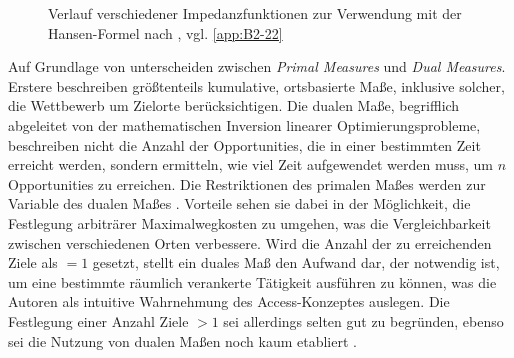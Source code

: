 \documentclass[11pt,pdftex,a4paper]{scrartcl}
\begin{document}
	\begin{figure}[!htb]
		\centering
		\caption[Impedanzfunktionen nach \textcite{levinsonTransportAccessManual2020}]{Verlauf verschiedener Impedanzfunktionen zur Verwendung mit der Hansen-Formel nach \textcite[49]{levinsonTransportAccessManual2020}, vgl. \ref{app:B2-22}}
		
		\label{fig:impedancefunctions}
	\end{figure}
	
	Auf Grundlage von \textcite{cuiPrimalDualAccess2020} unterscheiden \textcite[53]{levinsonTransportAccessManual2020} zwischen \textit{Primal Measures} und \textit{Dual Measures}. Erstere beschreiben größtenteils kumulative, ortsbasierte Maße, inklusive solcher, die Wettbewerb um Zielorte berücksichtigen. Die dualen Maße, begrifflich abgeleitet von der mathematischen Inversion linearer Optimierungsprobleme, beschreiben nicht die Anzahl der Opportunities, die in einer bestimmten Zeit erreicht werden, sondern ermitteln, wie viel Zeit aufgewendet werden muss, um $n$ Opportunities zu erreichen. Die Restriktionen des primalen Maßes werden zur Variable des dualen Maßes \parencite[vgl.][56]{fangLinearOptimizationExtensions1993}. Vorteile sehen sie dabei in der Möglichkeit, die Festlegung arbiträrer Maximalwegkosten zu umgehen, was die Vergleichbarkeit zwischen verschiedenen Orten verbessere. Wird die Anzahl der zu erreichenden Ziele als $=1$ gesetzt, stellt ein duales Maß den Aufwand dar, der notwendig ist, um eine bestimmte räumlich verankerte Tätigkeit ausführen zu können, was die Autoren als intuitive Wahrnehmung des Access-Konzeptes auslegen. Die Festlegung einer Anzahl Ziele $>1$ sei allerdings selten gut zu begründen, ebenso sei die Nutzung von dualen Maßen noch kaum etabliert \parencite[56]{levinsonTransportAccessManual2020}.
	
\end{document}
